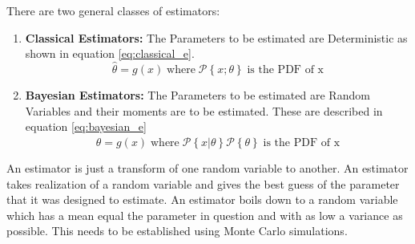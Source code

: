 There are two general classes of estimators:
\begin{enumerate} 
    \item \textbf{Classical Estimators:} The Parameters to be estimated are Deterministic as shown in equation \ref{eq:classical_e}.
    \begin{equation} \label{eq:classical_e}
        \hat{\theta} = g(x) \; \text{where} \; \mathcal{P}\left\{x; \theta\right\} \; \text{is the PDF of x}
    \end{equation}
    \item \textbf{Bayesian Estimators:} The Parameters to be estimated are Random Variables and their moments are to be estimated. These are described in equation \ref{eq:bayesian_e}
    \begin{equation} \label{eq:bayesian_e}
        \hat{\theta} = g(x) \; \text{where} \; \mathcal{P}\left\{x|\theta\right\} \mathcal{P}\left\{\theta\right\}\; \text{is the PDF of x}
    \end{equation}
\end{enumerate}

An estimator is just a transform of one random variable to another. An estimator takes realization of a random variable and gives the best guess of the parameter that it was designed to estimate. An estimator boils down to a random variable which has a mean equal the parameter in question and with as low a variance as possible. This needs to be established using Monte Carlo simulations.